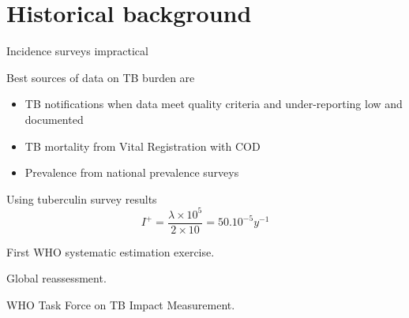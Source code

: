 \section{Historical background}

Incidence surveys impractical\cite{18201929}

Best sources of data on TB burden are 
\begin{itemize}
\item TB notifications when data meet quality criteria and under-reporting low and documented
\item TB mortality from Vital Registration with COD
\item Prevalence from national prevalence surveys
\end{itemize}

Using tuberculin survey results\cite{Styblo1985}
$$I^+ = \frac{\lambda \times 10^5}{2 \times 10} = 50.10^{-5} y^{-1}$$

First WHO systematic estimation exercise\cite{1600578}.

Global reassessment\cite{10517722}.

WHO Task Force on TB Impact Measurement\cite{18201929}.



  
  
  
  
  
  
  
  
  
  
  